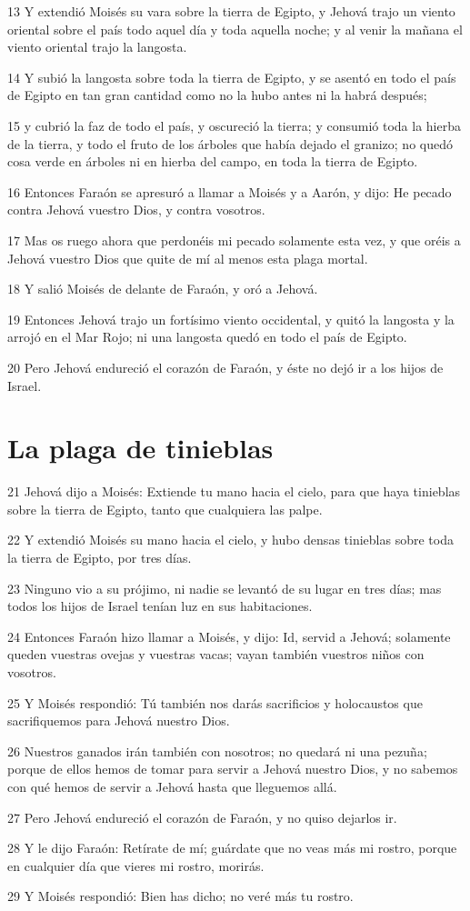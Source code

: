 \par 13 Y extendió Moisés su vara sobre la tierra de Egipto, y Jehová trajo un viento oriental sobre el país todo aquel día y toda aquella noche; y al venir la mañana el viento oriental trajo la langosta.
\par 14 Y subió la langosta sobre toda la tierra de Egipto, y se asentó en todo el país de Egipto en tan gran cantidad como no la hubo antes ni la habrá después;
\par 15 y cubrió la faz de todo el país, y oscureció la tierra; y consumió toda la hierba de la tierra, y todo el fruto de los árboles que había dejado el granizo; no quedó cosa verde en árboles ni en hierba del campo, en toda la tierra de Egipto.
\par 16 Entonces Faraón se apresuró a llamar a Moisés y a Aarón, y dijo: He pecado contra Jehová vuestro Dios, y contra vosotros.
\par 17 Mas os ruego ahora que perdonéis mi pecado solamente esta vez, y que oréis a Jehová vuestro Dios que quite de mí al menos esta plaga mortal.
\par 18 Y salió Moisés de delante de Faraón, y oró a Jehová.
\par 19 Entonces Jehová trajo un fortísimo viento occidental, y quitó la langosta y la arrojó en el Mar Rojo; ni una langosta quedó en todo el país de Egipto.
\par 20 Pero Jehová endureció el corazón de Faraón, y éste no dejó ir a los hijos de Israel.

\section*{La plaga de tinieblas}

\par 21 Jehová dijo a Moisés: Extiende tu mano hacia el cielo, para que haya tinieblas sobre la tierra de Egipto, tanto que cualquiera las palpe.
\par 22 Y extendió Moisés su mano hacia el cielo, y hubo densas tinieblas sobre toda la tierra de Egipto, por tres días.
\par 23 Ninguno vio a su prójimo, ni nadie se levantó de su lugar en tres días; mas todos los hijos de Israel tenían luz en sus habitaciones.
\par 24 Entonces Faraón hizo llamar a Moisés, y dijo: Id, servid a Jehová; solamente queden vuestras ovejas y vuestras vacas; vayan también vuestros niños con vosotros.
\par 25 Y Moisés respondió: Tú también nos darás sacrificios y holocaustos que sacrifiquemos para Jehová nuestro Dios.
\par 26 Nuestros ganados irán también con nosotros; no quedará ni una pezuña; porque de ellos hemos de tomar para servir a Jehová nuestro Dios, y no sabemos con qué hemos de servir a Jehová hasta que lleguemos allá.
\par 27 Pero Jehová endureció el corazón de Faraón, y no quiso dejarlos ir.
\par 28 Y le dijo Faraón: Retírate de mí; guárdate que no veas más mi rostro, porque en cualquier día que vieres mi rostro, morirás.
\par 29 Y Moisés respondió: Bien has dicho; no veré más tu rostro.

